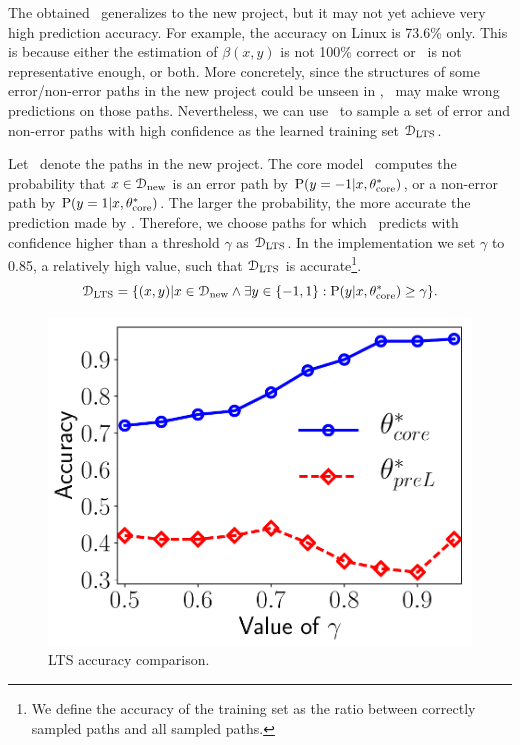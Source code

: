 \documentclass[12pt]{report}	%
\begin{document}
%
The obtained \cm\ generalizes to the new project,
but it may not yet achieve very high prediction accuracy.
For example, the accuracy on Linux is 73.6\% only.
This is because either the estimation of $\beta(x, y)$ is not 100\% correct
or \DS\ is not representative enough, or both.
More concretely, since the structures of some error/non-error paths 
in the new project could be unseen in \DS, \cm\ may make wrong predictions on those paths.
%
Nevertheless, we can use \cm\ to sample a set of error and non-error paths
with high confidence as the learned training set $\mathcal{D}_\text{LTS}$.

Let \DT\ denote the paths in the new project.
The core model \cm\ computes the probability that
$x \in \mathcal{D}_\text{new}$ is an error path by $\text{P} (y = -1 | x, \theta_\text{core}^*)$, 
or a non-error path by $\text{P} (y = 1 | x, \theta_\text{core}^*)$.
The larger the probability, the more accurate the prediction made by \cm.
%
Therefore, we choose paths
for which \cm\ predicts with confidence higher than a threshold $\gamma$
as $\mathcal{D}_\text{LTS}$.
In the implementation we set $\gamma$ to 0.85, a relatively high value,
such that $\mathcal{D}_\text{LTS}$ is accurate\footnote{
We define the accuracy of the training set
as the ratio between correctly sampled paths and all sampled paths.}.
%
\begin{equation} \label{mllabel}
\mathcal{D}_\text{LTS} = \{(x, y) | x \in \mathcal{D}_\text{new} \land \exists y \in \{-1, 1\}: \text{P} (y | x, \theta_\text{core}^*) \ge \gamma \}.
\end{equation}

\begin{figure}[t]
\centering
\includegraphics[width=.5\linewidth]{images/dt.pdf}
\caption{LTS accuracy comparison.}
\label{fig:trainset}
\end{figure}
\end{document}
